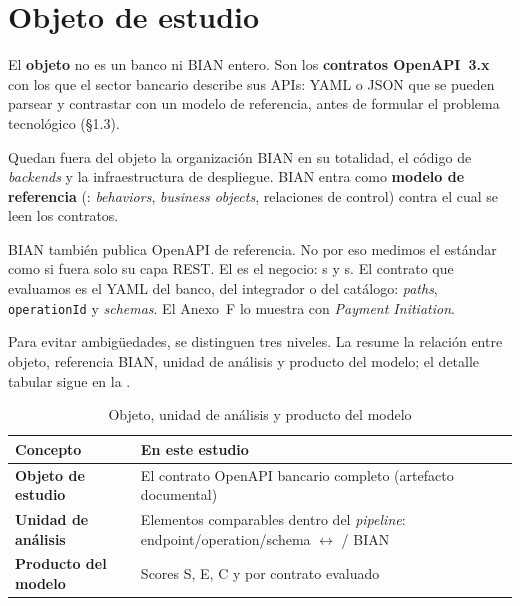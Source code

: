 \section{Objeto de estudio}
\label{sec:objeto-estudio}

El \textbf{objeto} no es un banco ni BIAN entero. Son los \textbf{contratos OpenAPI~3.x} con los
que el sector bancario describe sus APIs: YAML o JSON que se pueden parsear y contrastar con un
modelo de referencia, antes de formular el problema tecnológico (§1.3).

Quedan fuera del objeto la organización BIAN en su totalidad, el código de \textit{backends} y la
infraestructura de despliegue. BIAN entra como \textbf{modelo de referencia} (\ServiceDomain{}:
\textit{behaviors}, \textit{business objects}, relaciones de control) contra el cual se leen los
contratos.

BIAN también publica OpenAPI de referencia. No por eso medimos el estándar como si fuera solo su
capa REST. El \ServiceDomain{} es el negocio: \Behavior{}s y \BusinessObject{}s. El contrato que
evaluamos es el YAML del banco, del integrador o del catálogo: \textit{paths}, \texttt{operationId}
y \textit{schemas}. El Anexo~F lo muestra con \textit{Payment Initiation}.

Para evitar ambigüedades, se distinguen tres niveles. La  resume la relación
entre objeto, referencia BIAN, unidad de análisis y producto del modelo; el detalle tabular sigue
en la .



\begin{table}[H]
  \centering
  \caption{Objeto, unidad de análisis y producto del modelo}
  \label{tab:objeto-unidad-producto}
  \begin{tabular}{@{}p{}p{}@{}}
    \toprule
    \textbf{Concepto} & \textbf{En este estudio} \\
    \midrule
    \textbf{Objeto de estudio} & El contrato OpenAPI bancario completo (artefacto documental) \\
    \textbf{Unidad de análisis} &
    Elementos comparables dentro del \textit{pipeline}: endpoint/operation/schema $\leftrightarrow$
    \Behavior{} / \BusinessObject{} BIAN \\
    \textbf{Producto del modelo} & Scores S, E, C y \AlignmentScore{} por contrato evaluado \\
    \bottomrule
  \end{tabular}
\end{table}

